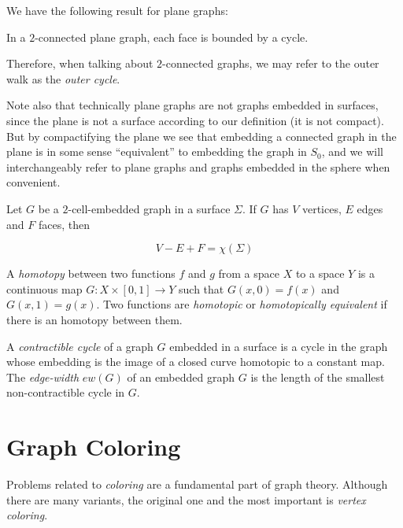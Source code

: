 We have the following result for plane graphs:

\begin{theorem}
In a $2$-connected plane graph, each face is bounded by a cycle.
\end{theorem}

Therefore, when talking about $2$-connected graphs, we may refer to the outer walk as the 
\emph{outer cycle}.

Note also that technically plane graphs are not graphs embedded in surfaces, since the plane is
not a surface according to our definition (it is not compact). But by compactifying the plane
we see that embedding a connected graph in the plane is in some sense ``equivalent'' to embedding 
the graph in $S_0$, and we will interchangeably refer to plane graphs and graphs embedded in the 
sphere when convenient. 

\begin{theorem}
Let $G$ be a $2$-cell-embedded graph in a surface $\Sigma$. If $G$ has $V$ vertices, $E$ edges and 
$F$ faces, then

\[
V - E + F = \chi(\Sigma)
\]
\end{theorem}

\begin{definition}
A \emph{homotopy} between two functions $f$ and $g$ from a space $X$ to a space $Y$ is a continuous
map $G : X \times [0, 1] \rightarrow Y$ such that $G(x, 0) = f(x)$ and $G(x, 1) = g(x)$. 
Two functions are \emph{homotopic} or \emph{homotopically equivalent} if there is an homotopy
between them. 
\end{definition}

\begin{definition}
A \emph{contractible cycle} of a graph $G$ embedded in a surface is a cycle in the graph whose 
embedding is the image of a closed curve homotopic to a constant map.
The \emph{edge-width} $ew(G)$ of an embedded graph $G$ 
is the length of the smallest non-contractible cycle in $G$. 
\end{definition}





\section{Graph Coloring}

Problems related to \emph{coloring} are a fundamental part of graph theory. Although there are many variants, the original one and the most important is \emph{vertex coloring}.

